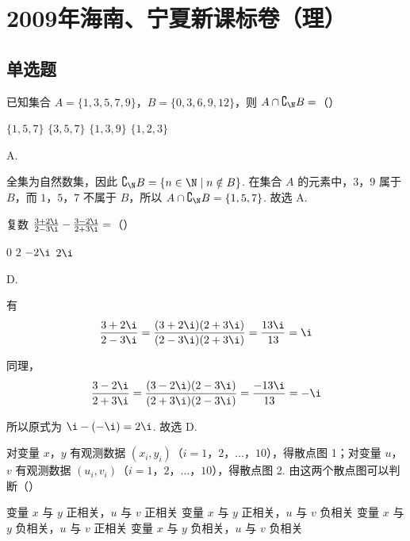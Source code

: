 \chapter{2009年海南、宁夏新课标卷（理）}

\section{单选题}

\begin{problem}
已知集合 \(A = \{1, 3, 5, 7, 9\}\)，\(B = \{0, 3, 6, 9, 12\}\)，则 \(A \cap \complement_{\N} B =\)（\quad）

\choices
    {\(\{1, 5, 7\}\)}
    {\(\{3, 5, 7\}\)}
    {\(\{1, 3, 9\}\)}
    {\(\{1, 2, 3\}\)}
\end{problem}

\begin{answer}
A.
\end{answer}

\begin{solution}
全集为自然数集，因此
\(\complement_{\N}B=\{n\in\N\mid n\notin B\}\). 在集合 \(A\) 的元素中，\(3\)，\(9\) 属于 \(B\)，而 \(1\)，\(5\)，\(7\) 不属于 \(B\)，所以
\(A\cap\complement_{\N}B=\{1,5,7\}\).
故选 A.
\end{solution}

\begin{problem}
复数 \(\frac{3 + 2\i}{2 - 3\i} - \frac{3 - 2\i}{2 + 3\i} =\)（\quad）

\choices
    {\(0\)}
    {\(2\)}
    {\(-2\i\)}
    {\(2\i\)}
\end{problem}

\begin{answer}
D.
\end{answer}

\begin{solution}
有
\[
\frac{3+2\i}{2-3\i}=\frac{(3+2\i)(2+3\i)}{(2-3\i)(2+3\i)}=\frac{13\i}{13}=\i
\]

同理，
\[
\frac{3-2\i}{2+3\i}=\frac{(3-2\i)(2-3\i)}{(2+3\i)(2-3\i)}=\frac{-13\i}{13}=-\i
\]

所以原式为 \(\i-(-\i)=2\i\). 故选 D.
\end{solution}

\begin{problem}
对变量 \(x\)，\(y\) 有观测数据 \((x_{i}, y_{i})\)（\(i = 1\)，\(2\)，\(\dots\)，\(10\)），得散点图 1；对变量 \(u\)，\(v\) 有观测数据 \((u_{i}, v_{i})\)（\(i = 1\)，\(2\)，\(\dots\)，\(10\)），得散点图 2. 由这两个散点图可以判断（\quad）


\choices
    {变量 \(x\) 与 \(y\) 正相关，\(u\) 与 \(v\) 正相关}
    {变量 \(x\) 与 \(y\) 正相关，\(u\) 与 \(v\) 负相关}
    {变量 \(x\) 与 \(y\) 负相关，\(u\) 与 \(v\) 正相关}
    {变量 \(x\) 与 \(y\) 负相关，\(u\) 与 \(v\) 负相关}
\end{problem}

